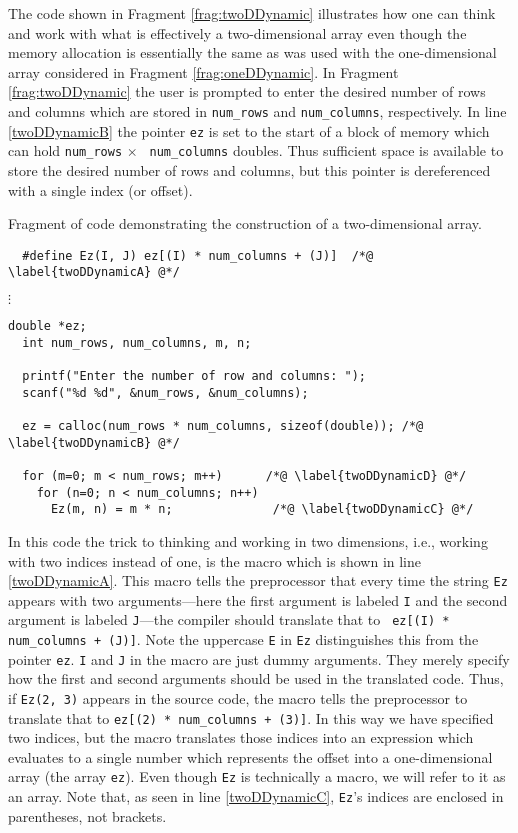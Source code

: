 The code shown in Fragment \ref{frag:twoDDynamic} illustrates how one
can think and work with what is effectively a two-dimensional array
even though the memory allocation is essentially the same as was used
with the one-dimensional array considered in Fragment
\ref{frag:oneDDynamic}.  In Fragment \ref{frag:twoDDynamic} the user
is prompted to enter the desired number of rows and columns which are
stored in {\tt num\_rows} and {\tt num\_columns}, respectively.  In
line \ref{twoDDynamicB} the pointer {\tt ez} is set to the start of a
block of memory which can hold {\tt num\_rows} $\times$ {\tt
num\_columns} doubles.  Thus sufficient space is available to store
the desired number of rows and columns, but this pointer is
dereferenced with a single index (or offset).
\begin{fragment}
Fragment of code demonstrating the construction of a two-dimensional
array. \label{frag:twoDDynamic}
\codemiddle
\begin{lstlisting}
  #define Ez(I, J) ez[(I) * num_columns + (J)]  /*@ \label{twoDDynamicA} @*/
\end{lstlisting}
\mbox{}\hspace{.5in}$\vdots$
\begin{lstlisting}[firstnumber=2]
  double *ez;
  int num_rows, num_columns, m, n;

  printf("Enter the number of row and columns: ");
  scanf("%d %d", &num_rows, &num_columns);

  ez = calloc(num_rows * num_columns, sizeof(double)); /*@ \label{twoDDynamicB} @*/

  for (m=0; m < num_rows; m++)      /*@ \label{twoDDynamicD} @*/
    for (n=0; n < num_columns; n++) 
      Ez(m, n) = m * n;              /*@ \label{twoDDynamicC} @*/
\end{lstlisting}
\end{fragment}

In this code the trick to thinking and working in two dimensions,
i.e., working with two indices instead of one, is the macro which is
shown in line \ref{twoDDynamicA}.  This macro tells the preprocessor
that every time the string {\tt Ez} appears with two arguments---here
the first argument is labeled {\tt I} and the second argument is
labeled {\tt J}---the compiler should translate that to {\tt
ez[(I) * num\_columns + (J)]}.  Note the uppercase {\tt E} in {\tt Ez}
distinguishes this from the pointer {\tt ez}.  {\tt I} and {\tt J} in
the macro are just dummy arguments.  They merely specify how the first
and second arguments should be used in the translated code.  Thus, if
{\tt Ez(2, 3)} appears in the source code, the macro tells the
preprocessor to translate that to {\tt ez[(2) * num\_columns + (3)]}.
In this way we have specified two indices, but the macro translates
those indices into an expression which evaluates to a single number
which represents the offset into a one-dimensional array (the array
{\tt ez}).  Even though {\tt Ez} is technically a macro, we will refer
to it as an array.  Note that, as seen in line \ref{twoDDynamicC},
{\tt Ez}'s indices are enclosed in parentheses, not brackets.


